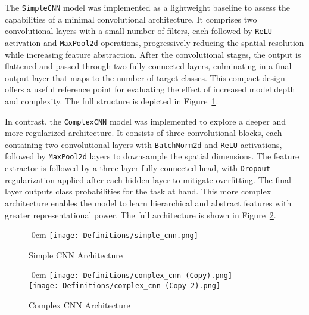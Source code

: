 \documentclass[journal,article,submit,pdftex,moreauthors]{Definitions/mdpi}
\begin{document}
The \texttt{SimpleCNN} model was implemented as a lightweight baseline to assess the capabilities of a minimal convolutional architecture. It comprises two convolutional layers with a small number of filters, each followed by \texttt{ReLU} activation and \texttt{MaxPool2d} operations, progressively reducing the spatial resolution while increasing feature abstraction. After the convolutional stages, the output is flattened and passed through two fully connected layers, culminating in a final output layer that maps to the number of target classes. This compact design offers a useful reference point for evaluating the effect of increased model depth and complexity. The full structure is depicted in Figure~\ref{fig:arq_simples}.

In contrast, the \texttt{ComplexCNN} model was implemented to explore a deeper and more regularized architecture. It consists of three convolutional blocks, each containing two convolutional layers with \texttt{BatchNorm2d} and \texttt{ReLU} activations, followed by \texttt{MaxPool2d} layers to downsample the spatial dimensions. The feature extractor is followed by a three-layer fully connected head, with \texttt{Dropout} regularization applied after each hidden layer to mitigate overfitting. The final layer outputs class probabilities for the task at hand. This more complex architecture enables the model to learn hierarchical and abstract features with greater representational power. The full architecture is shown in Figure~\ref{fig:arq_complexa}.


\begin{figure}[H]
\begin{adjustwidth}{-\extralength}{0cm}
\centering
\texttt{[image: Definitions/simple\_cnn.png]}
\end{adjustwidth}
\caption{Simple CNN Architecture \label{fig:arq_simples}}
\end{figure}

\begin{figure}[H]
\begin{adjustwidth}{-\extralength}{0cm}
\centering
\texttt{[image: Definitions/complex\_cnn (Copy).png]}\\[0.5em]
\texttt{[image: Definitions/complex\_cnn (Copy 2).png]}
\end{adjustwidth}
\caption{Complex CNN Architecture \label{fig:arq_complexa}}
\end{figure}

\end{document}
